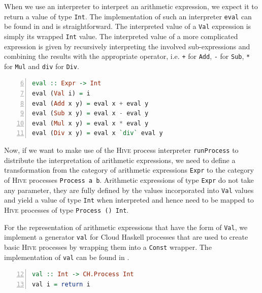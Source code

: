 When we use an interpreter to interpret an arithmetic expression, we expect it to return a value of type \texttt{Int}. The implementation of such an interpreter \texttt{eval} can be found in  and is straightforward. The interpreted value of a \texttt{Val} expression is simply its wrapped \texttt{Int} value. The interpreted value of a more complicated expression is given by recursively interpreting the involved sub-expressions and combining the results with the appropriate operator, i.e. \texttt{+} for \texttt{Add}, \texttt{-} for \texttt{Sub}, \texttt{*} for \texttt{Mul} and \texttt{div} for \texttt{Div}.
\begin{lstlisting}[language=Haskell, caption=Implementation of an interpreter for arithmetic expressions of type \texttt{Expr}., label=lst:arith_eval, numbers=left, frame=bt, firstnumber=6]
eval :: Expr -> Int
eval (Val i) = i
eval (Add x y) = eval x + eval y
eval (Sub x y) = eval x - eval y
eval (Mul x y) = eval x * eval y
eval (Div x y) = eval x `div` eval y
\end{lstlisting}

Now, if we want to make use of the \textsc{Hive} process interpreter \texttt{runProcess} to distribute the interpretation of arithmetic expressions, we need to define a transformation from the category of arithmetic expressions \texttt{Expr} to the category of \textsc{Hive} processes \texttt{Process a b}. Arithmetic expressions of type \texttt{Expr} do not take any parameter, they are fully defined by the values incorporated into \texttt{Val} values and yield a value of type \texttt{Int} when interpreted and hence need to be mapped to \textsc{Hive} processes of type \texttt{Process () Int}.

For the representation of arithmetic expressions that have the form of \texttt{Val}, we implement a generator \texttt{val} for \textsf{Cloud Haskell} processes that are used to create basic \textsc{Hive} processes by wrapping them into a \texttt{Const} wrapper. The implementation of \texttt{val} can be found in .
\begin{lstlisting}[language=Haskell, caption=A generator for \textsf{Cloud Haskell} process for the representation of \texttt{Val} nodes., label=lst:arith_val, numbers=left, frame=bt, firstnumber=12]
val :: Int -> CH.Process Int
val i = return i
\end{lstlisting}

